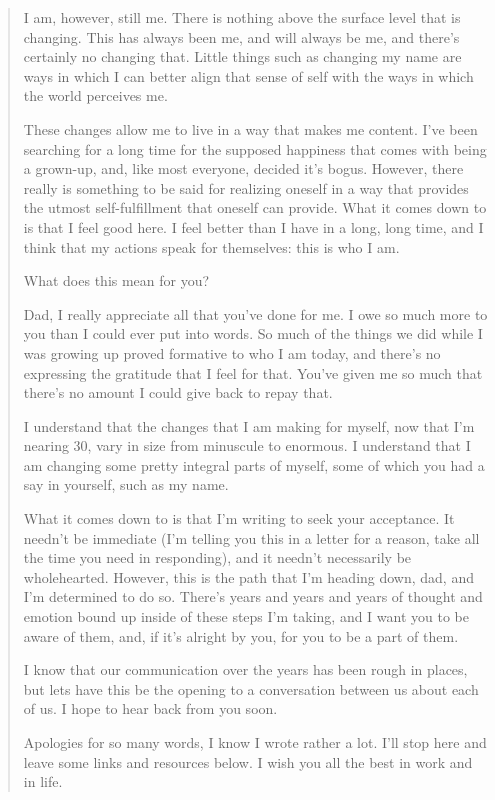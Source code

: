 \begin{paracol}{2}
\begin{leftcolumn}
\begin{quotation}
I am, however, still me.  There is nothing above the surface level that is changing.  This has always been me, and will always be me, and there's certainly no changing that.  Little things such as changing my name are ways in which I can better align that sense of self with the ways in which the world perceives me.

These changes allow me to live in a way that makes me content.  I've been searching for a long time for the supposed happiness that comes with being a grown-up, and, like most everyone, decided it's bogus.  However, there really is something to be said for realizing oneself in a way that provides the utmost self-fulfillment that oneself can provide.  What it comes down to is that I feel good here.  I feel better than I have in a long, long time, and I think that my actions speak for themselves: this is who I am.

What does this mean for you?

Dad, I really appreciate all that you've done for me.  I owe so much more to you than I could ever put into words.  So much of the things we did while I was growing up proved formative to who I am today, and there's no expressing the gratitude that I feel for that.  You've given me so much that there's no amount I could give back to repay that.

I understand that the changes that I am making for myself, now that I'm nearing 30, vary in size from minuscule to enormous.  I understand that I am changing some pretty integral parts of myself, some of which you had a say in yourself, such as my name.

What it comes down to is that I'm writing to seek your acceptance.  It needn't be immediate (I'm telling you this in a letter for a reason, take all the time you need in responding), and it needn't necessarily be wholehearted.  However, this is the path that I'm heading down, dad, and I'm determined to do so.  There's years and years and years of thought and emotion bound up inside of these steps I'm taking, and I want you to be aware of them, and, if it's alright by you, for you to be a part of them.

I know that our communication over the years has been rough in places, but lets have this be the opening to a conversation between us about each of us.  I hope to hear back from you soon.

Apologies for so many words, I know I wrote rather a lot.  I'll stop here and leave some links and resources below.  I wish you all the best in work and in life.


\end{quotation}
\end{leftcolumn}
\end{paracol}
